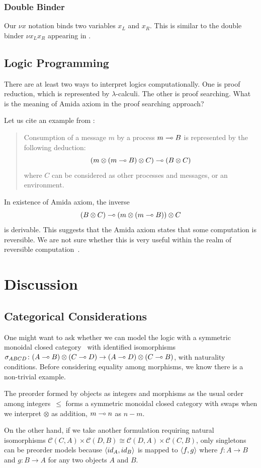  \subsubsection{Double Binder}
 Our $\nu x$ notation binds two variables $x_L$ and $x_R$.
 This is similar to the double binder $\nu x_L x_R$ appearing in
 \citet{gay2010}.

 \subsection{Logic Programming}

 There are at least two ways to interpret logics computationally.
 One is proof reduction, which is represented by $\lambda$-calculi.
 The other is proof searching.  What is the meaning of Amida axiom in
 the proof searching approach?

 Let us cite an example from \citet[A.2]{kobayashi-yonezawa}:
 \begin{quote}
  Consumption of a message $m$ by a process $m\multimap B$ is represented by
  the following deduction:
  \[
   (m\otimes(m\multimap B)\otimes C)\multimap (B\otimes C)
  \]
  where $C$ can be considered as other processes and messages, or an environment.
 \end{quote}
 In existence of Amida axiom,
 the inverse
 \[
  (B\otimes C)\multimap (m\otimes (m\multimap B))\otimes C
 \]
 is derivable.
 This suggests that the Amida axiom states that some
 computation is reversible.  We are not sure whether this is very
 useful within the realm of reversible computation~\citep{revcon}.

\section{Discussion}

\subsection{Categorical Considerations}
One might want to ask whether we can model the logic with
a symmetric monoidal closed category~\citep{blute2004category}
  with identified isomorphisms
$\sigma_{ABCD}\colon (A\multimap B)\otimes (C\multimap D)\rightarrow (A\multimap D) \otimes
 (C\multimap B)$, with naturality conditions.
 Before considering equality among morphisms,
 we know there is a non-trivial example.
  \begin{example}
   \label{smcc}
   The preorder formed by objects as integers and morphisms as the usual
   order among integers~$\le$
   forms a symmetric monoidal closed category with swaps
   when we interpret $\otimes$ as addition,
   $m \multimap n$ as $n-m$.
  \end{example}
  On the other hand,
  if we take another formulation requiring natural isomorphisms
  $\mathcal C(C,A)\times\mathcal C(D,B) \cong \mathcal C(D,A)\times
  \mathcal C{(C,B)}$,
  only singletons can be preorder models because $\langle{id_A,id_B}\rangle$ is
  mapped to $\langle{f,g}\rangle$ where $f\colon A\rightarrow B$ and $g\colon
  B\rightarrow A$ for any two objects $A$ and $B$.

